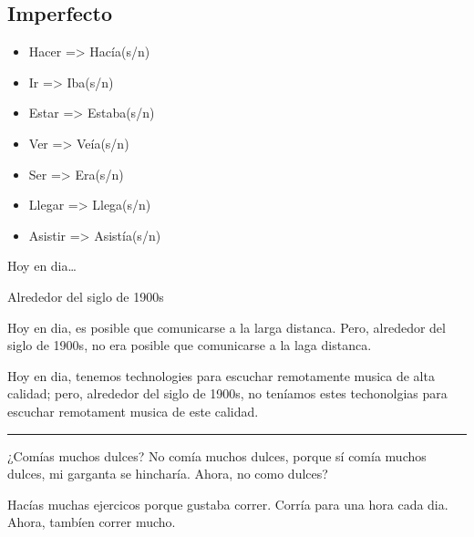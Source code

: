 \documentclass[letterpaper]{article}
\begin{document}
\subsection{Imperfecto}
\label{sec:orgd6a5fba}
\begin{itemize}
\item Hacer => Hacía(s/n)
\item Ir => Iba(s/n)
\item Estar => Estaba(s/n)
\item Ver => Veía(s/n)
\item Ser => Era(s/n)
\item Llegar => Llega(s/n)
\item Asistir => Asistía(s/n)
\end{itemize}

Hoy en dia\ldots{}

Alrededor del siglo de 1900s

Hoy en dia, es posible que comunicarse a la larga distanca. Pero,
alrededor del siglo de 1900s, no era posible que comunicarse a la laga
distanca.

Hoy en dia, tenemos technologies para escuchar remotamente musica de
alta calidad; pero, alrededor del siglo de 1900s, no teníamos estes
techonolgias para escuchar remotament musica de este calidad.

\noindent\rule{\textwidth}{0.5pt}

¿Comías muchos dulces? No comía muchos dulces, porque sí comía muchos
dulces, mi garganta se hincharía. Ahora, no como dulces?

Hacías muchas ejercicos porque gustaba correr. Corría para una hora cada
dia. Ahora, tambíen correr mucho.
\end{document}
